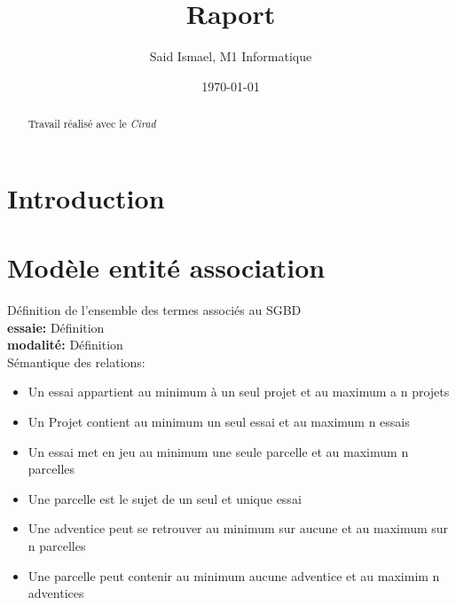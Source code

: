 \documentclass{article}
\title{Raport}
\author{Said Ismael, M1 Informatique}
\date{\today}
\begin{document}
\maketitle %


\newpage
\thispagestyle{empty}
\mbox{}
\newpage




\tableofcontents
\newpage


\section{Introduction}
\begin{abstract}
  Travail réalisé avec le \textit{Cirad}~\cite{coursera}
\end{abstract}



\section{Modèle entité association}
Définition de l'ensemble des termes associés au SGBD \\ 
\textbf{essaie:} Définition
\\\textbf{modalité:} Définition \\
Sémantique des relations:
\begin{itemize}
  \item Un essai appartient au minimum à un seul projet et au maximum a n projets 
  \item Un Projet contient au minimum un seul essai et au maximum n essais
  \item Un essai met en jeu au minimum une seule parcelle et au maximum n parcelles
  \item Une parcelle est le sujet de un seul et unique essai
  \item Une adventice peut se retrouver au minimum sur aucune et au maximum sur n parcelles
  \item Une parcelle peut contenir au minimum aucune adventice et au maximim n adventices
  
\end{itemize}
\end{document}
